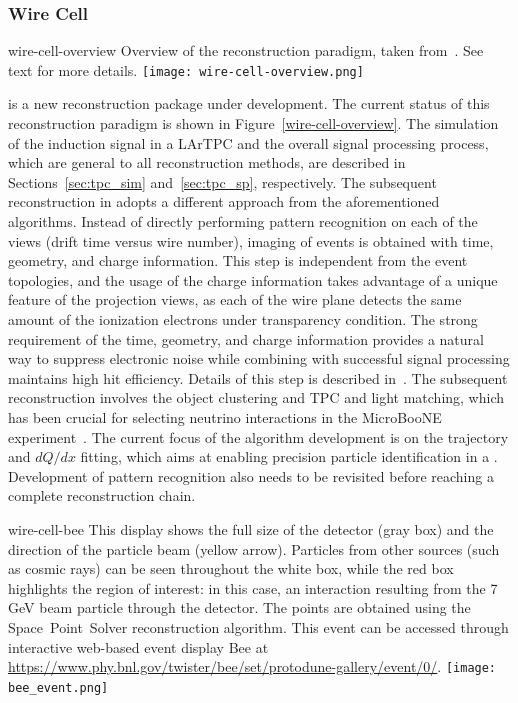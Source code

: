 \subsubsection{Wire Cell}

\begin{dunefigure}
{wire-cell-overview}
{Overview of the  reconstruction paradigm, taken from~\cite{ref:wc_talk}. 
See text for more details.}
\texttt{[image: wire-cell-overview.png]}\end{dunefigure}



 is a new reconstruction package under development. The current 
status of this reconstruction paradigm is shown in Figure~\ref{wire-cell-overview}. The 
simulation of the induction signal in a LArTPC and the overall signal processing process,
which are general to all reconstruction methods, are described in Sections~\ref{sec:tpc_sim} 
and~\ref{sec:tpc_sp}, respectively. The subsequent reconstruction in  adopts 
a different approach from the aforementioned algorithms. Instead of directly performing pattern 
recognition on each of the \twod views (drift time versus wire number), \threed imaging of events 
is obtained with time, geometry, and charge information. This step is independent from 
the event topologies, and the usage of the charge information takes advantage of a unique 
feature of the projection views, as each of the wire plane detects the same 
amount of the ionization electrons under transparency condition. The strong requirement of the time, geometry, and charge 
information provides a natural way to suppress electronic noise
 while combining with successful signal processing maintains high hit efficiency. Details of this step is described in~\cite{Qian:2018qbv}. The subsequent reconstruction involves the object clustering and
TPC and light matching, which has been crucial for selecting neutrino interactions in the 
MicroBooNE experiment~\cite{uboone_wc_note}. The current focus of the  algorithm 
development is on the trajectory and $dQ/dx$ fitting, which aims at enabling precision particle
identification in a \lartpc. %
Development of \threed pattern recognition also needs
to be revisited before reaching a complete reconstruction chain. 

\begin{dunefigure}
{wire-cell-bee}
{This \threed display shows the full size of the  detector (gray box) and 
the direction of the particle beam (yellow arrow). Particles from other sources (such as cosmic rays) 
can be seen throughout the white box, while the red box highlights the region of interest: 
in this case, an interaction resulting from the 7 GeV beam particle through the detector. 
The \threed points are obtained using the Space~Point~Solver reconstruction algorithm. This event
can be accessed through interactive web-based event display Bee at \url{https://www.phy.bnl.gov/twister/bee/set/protodune-gallery/event/0/}.}
\texttt{[image: bee\_event.png]}
\end{dunefigure}



